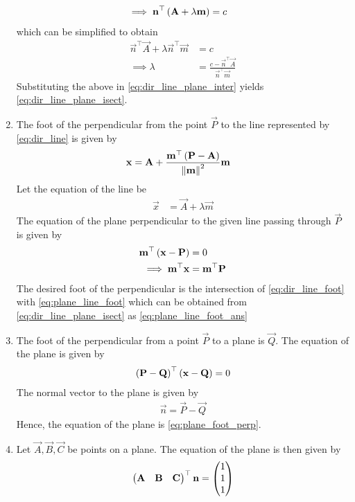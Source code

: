 \documentclass[journal,12pt,twocolumn]{IEEEtran}
\renewcommand\thesection{\arabic{section}}
\renewcommand\thesubsection{\thesection.\arabic{subsection}}
\begin{document}
\begin{enumerate}[label=\thesubsection.\arabic*.,ref=\thesubsection.\theenumi]
\begin{align}
	\implies 
	\mathbf{n}^{\top}\left(\mathbf{A} + \lambda \mathbf{m}\right)&= c
	\label{eq:dir_line_plane_inter}
\end{align}
which can be simplified to obtain
\begin{align}
	\vec{n}^{\top}\vec{A} + \lambda 	\vec{n}^{\top}\vec{m}&= c
	\\
	\implies \lambda &= \frac{c - \vec{n}^{\top}\vec{A}}{\vec{n}^{\top}\vec{m}}
\end{align}
Substituting the above in 
	\eqref{eq:dir_line_plane_inter}
	yields
	\eqref{eq:dir_line_plane_isect}.
\item The foot of the perpendicular from the point $\vec{P}$ to the line  represented by 
	\eqref{eq:dir_line}
	is given by 
\begin{align}
	\label{eq:plane_line_foot_ans}
	\mathbf{x} &= \mathbf{A} + \frac{ \mathbf{m}^{\top}\left(\mathbf{P} - \mathbf{A}\right)}{\left\lVert\mathbf{m}\right\rVert^2}
\mathbf{m}
\end{align}
\solution  Let the equation of the line be 
\begin{align}
	\label{eq:dir_line_foot}
	\vec{x} &= \vec{A} + \lambda \vec{m}
\end{align}
	The equation of the plane perpendicular to the given line passing through $\vec{P}$ is given by
\begin{align}
	\label{eq:plane_line_foot}
	\mathbf{m}^{\top}\left(\mathbf{x}-\mathbf{P}\right)  &= 0
	\\
	\implies \mathbf{m}^{\top}\mathbf{x}  &= \mathbf{m}^{\top}\mathbf{P}
\end{align}
The desired foot of the perpendicular is the intersection of 
	\eqref{eq:dir_line_foot} with 
	\eqref{eq:plane_line_foot}
	which can be obtained from 
	\eqref{eq:dir_line_plane_isect}
	as 
	\eqref{eq:plane_line_foot_ans}
\item The foot of the perpendicular from a point $\vec{P}$ to a plane is $\vec{Q}$.  The equation of the plane is given by 
\begin{align}
	\label{eq:plane_foot_perp}
	\left(\mathbf{P}-\mathbf{Q}\right)^{\top}\left(\mathbf{x}-\mathbf{Q}\right) = 0
\end{align}
	\solution  The normal vector to the plane is given by 
\begin{align}
	\vec{n}= \vec{P}-\vec{Q} 
\end{align}
	Hence, the equation of the plane is
	\eqref{eq:plane_foot_perp}.
\item Let $\vec{A}, \vec{B}, \vec{C}$ be  points on a plane.  The equation of the plane is then given by 	
\begin{align}
	\myvec{	\vec{A} & \vec{B}& \vec{C}}^{\top} \vec{n}= \myvec{1\\1\\1}

\end{align}
\end{enumerate}
\end{document}
